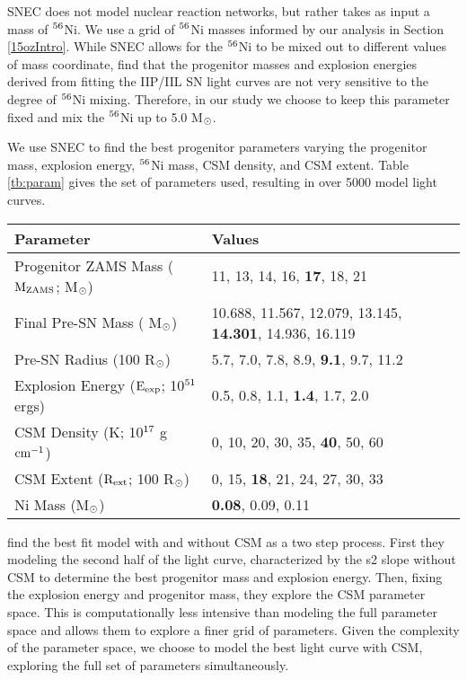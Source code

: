 \documentclass[a4paper,fleqn,usenatbib]{mnras}
\newcommand{\msunperiod}{M$\rm{_{\odot}}$}
\begin{document}
SNEC does not model nuclear reaction networks, but rather takes as input a mass of $\rm{{}^{56}}$Ni. 
We use a grid of $\rm{{}^{56}}$Ni masses informed by our analysis in Section \ref{15ozIntro}.
While SNEC allows for the $\rm{{}^{56}}$Ni to be mixed out to different values of mass coordinate, \citet{2017morozova} find that the progenitor masses and explosion energies derived from fitting the IIP/IIL SN light curves are not very sensitive to the degree of $\rm{{}^{56}}$Ni mixing.
Therefore, in our study we choose to keep this parameter fixed and mix the $\rm{{}^{56}}$Ni up to 5.0 M$\rm{_{\odot}}$.

We use SNEC to find the best progenitor parameters varying the progenitor mass, explosion energy, $\rm{{}^{56}}$Ni mass, CSM density, and CSM extent. 
Table \ref{tb:param} gives the set of parameters used, resulting in over 5000 model light curves.
\begin{table*}
\centering
\caption{The grid of parameters used by SNEC. 
The values that best fit the data are in bold. The pre-explosion masses are taken from Table 2 of \citet{2016sukhbold}.}
\label{tb:param}
\begin{tabular}{l|l}
\hline
Parameter & Values \\
\hline
Progenitor ZAMS Mass ($\rm{M_{ZAMS}}$; \msunperiod) & 11, 13, 14, 16, {\bf17}, 18, 21 \\
Final Pre-SN Mass ( \msunperiod) & 10.688, 11.567, 12.079, 13.145, {\bf14.301}, 14.936, 16.119 \\
Pre-SN Radius (100 R$\rm{_{\odot}}$)                     & 5.7, 7.0, 7.8, 8.9, {\bf9.1}, 9.7, 11.2 \\
Explosion Energy ($\rm{E_{exp}}$; 10$\rm{^{51}}$ ergs)   & 0.5, 0.8, 1.1, {\bf 1.4}, 1.7, 2.0 \\
CSM Density (K; 10$\rm{^{17}}$ g $\rm{cm^{-1}}$)            & 0, 10, 20, 30, 35, {\bf40}, 50, 60 \\
CSM Extent ($\rm{R_{ext}}$; 100 R$\rm{_{\odot}}$)           & 0, 15, {\bf18}, 21, 24, 27, 30, 33 \\
Ni Mass (\msunperiod)                                                        & {\bf 0.08}, 0.09, 0.11 \\
\hline
\end{tabular}
\end{table*}
\citet{2018morozova} find the best fit model with and without CSM as a two step process. 
First they modeling the second half of the light curve, characterized by the s2 slope without CSM to determine the best progenitor mass and explosion energy. 
Then, fixing the explosion energy and progenitor mass, they explore the CSM parameter space. 
This is computationally less intensive than modeling the full parameter space and allows them to explore a finer grid of parameters.
Given the complexity of the parameter space, we choose to model the best light curve with CSM, exploring the full set of parameters simultaneously. 
\end{document}
